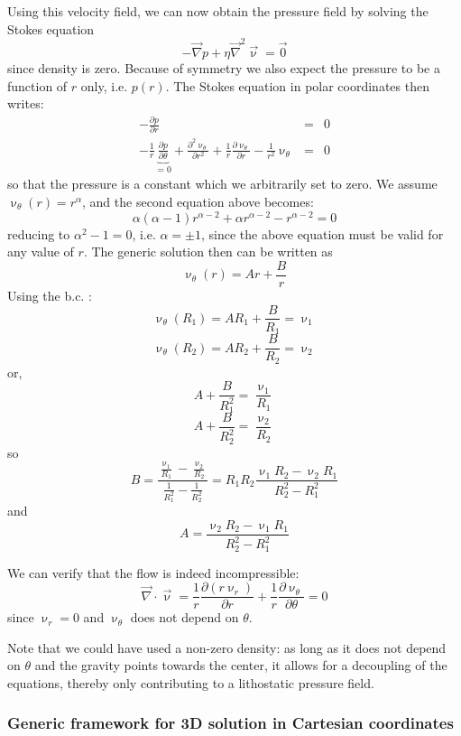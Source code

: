 Using this velocity field, we can now obtain the pressure field 
by solving the Stokes equation
\[
-\vec\nabla p + \eta {\vec\nabla}^2 {\vec \upnu} = {\vec 0}
\]
since density is zero. Because of symmetry we also expect the pressure to
be a function of $r$ only, i.e. $p(r)$.
The Stokes equation in polar coordinates then writes:
\begin{eqnarray}
-\frac{\partial p}{\partial r} &=& 0 \\
-\frac{1}{r}\underbrace{\frac{\partial p}{\partial \theta}}_{=0} + 
\frac{\partial^2 \upnu_\theta}{\partial r^2} + \frac{1}{r} \frac{\partial \upnu_\theta}{\partial r} 
- \frac{1}{r^2} \upnu_\theta  &=&0 
\end{eqnarray}
so that the pressure is a constant which we arbitrarily set to zero. 
We assume $\upnu_\theta(r) = r^\alpha$, and the second equation above becomes: 
\[
\alpha(\alpha-1) r^{\alpha-2}  + \alpha r^{\alpha-2}  - r^{\alpha-2}  = 0 
\]
reducing to $\alpha^2-1=0$, i.e. $\alpha=\pm 1$, since the above equation must be valid
for any value of $r$.
The generic solution then can be written as
\[
\upnu_\theta (r) = A r + \frac{B}{r}
\]
Using the b.c. : 
\[
\upnu_\theta (R_1) = A R_1 + \frac{B}{R_1} = \upnu_1
\]
\[
\upnu_\theta (R_2) = A R_2 + \frac{B}{R_2} = \upnu_2
\]
or, 
\[
A + \frac{B}{R_1^2} = \frac{\upnu_1}{R_1}
\]
\[
A + \frac{B}{R_2^2} = \frac{\upnu_2}{R_2}
\]
so
\[
B=\frac{ \frac{\upnu_1}{R_1}-\frac{\upnu_2}{R_2}  }{\frac{1}{R_1^2} - \frac{1}{R_2^2}} = 
R_1R_2 \frac{ \upnu_1R_2-\upnu_2R_1    }{R_2^2-R_1^2}
\]
and 
\[
A=\frac{\upnu_2R_2-\upnu_1R_1}{R_2^2-R_1^2}
\]

We can verify that the flow is indeed incompressible:
\[
\vec\nabla\cdot\vec\upnu = \frac{1}{r}\frac{\partial (r\upnu_r)}{\partial r} 
+ \frac{1}{r}\frac{\partial \upnu_\theta}{\partial \theta} = 0
\]
since $\upnu_r=0$ and $\upnu_\theta$ does not depend on $\theta$.

Note that we could have used a non-zero density: as long as it does not 
depend on $\theta$ and the gravity points towards the center,
it allows for a decoupling of the equations, thereby 
only contributing to a lithostatic pressure field.

\subsubsection{Generic framework for 3D solution in Cartesian coordinates}\label{ss:mms3Dgen}

